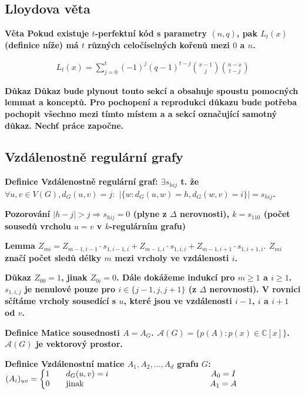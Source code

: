 \documentclass[a4paper,12pt,titlepage]{article}
\newcommand{\lm}{\smallskip\noindent\bf Lemma\rm{} }
\newcommand{\dk}{\smallskip\noindent\bf Důkaz\rm{} }
\newcommand{\df}{\smallskip\noindent\bf Definice\rm{} }
\newcommand{\vt}{\smallskip\noindent\bf Věta\rm{} }
\newcommand{\poz}{\smallskip\noindent\bf Pozorování\rm{} }
\newcommand{\A}{\mathcal{A}}
\newcommand{\C}{\mathbb{C}}
\begin{document}
\subsection{Lloydova věta}

\vt Pokud existuje $t$-perfektní kód s parametry $(n,q)$, pak $L_t(x)$ (definice níže) má $t$ různých celočíselných kořenů mezi $0$ a $n$.

\begin{align}
	L_t(x) = \sum_{j=0}^t(-1)^j(q-1)^{t-j}\binom{x-1}{j}\binom{n-x}{t-j}
\end{align}

\dk Důkaz bude plynout touto sekcí a obsahuje spoustu pomocných lemmat a konceptů. Pro pochopení a reprodukci důkazu bude potřeba pochopit všechno mezi tímto místem a a sekcí označující samotný důkaz. Nechť práce započne.

\subsection{Vzdálenostně regulární grafy}

\df Vzdálenostně regulární graf: $\exists s_{hij}$ t. že $\forall u,v\in V(G), d_G(u,v) = j:$ $|\{w: d_G(u,w) = h, d_G(w,v) = i\}| = s_{hij}$.

\poz $|h-j| > j \Rightarrow s_{hij} = 0$ (plyne z $\Delta$ nerovnosti), $k = s_{110}$ (počet sousedů vrcholu $u = v$ v $k$-regulárním grafu)

\lm $Z_{mi} = Z_{m-1,i-1} \cdot s_{1,i-1,i} + Z_{m-1,i} \cdot s_{1,i,i} + Z_{m-1,i+1} \cdot s_{1,i+1,i}.$ $Z_{mi}$ značí počet sledů délky $m$ mezi vrcholy ve vzdálenosti $i$.

\dk $Z_{00} = 1$, jinak $Z_{0i} = 0$. Dále dokážeme indukcí pro $m \ge 1$ a $i
\ge 1$. $s_{1,i,j}$ je nenulové pouze pro $i \in \{j-1,j,j+1\}$ (z $\Delta$
nerovnosti). V rovnici sčítáme vrcholy sousedící s $u$, které jsou ve
vzdálenosti $i-1$, $i$ a $i+1$ od $v$.

\df Matice sousednosti $A = A_G$. $\A(G) = \{p(A): p(x) \in \C[x]\}$. $\A(G)$ je
vektorový prostor.

\df Vzdálenostní matice $A_1, A_2, \dots, A_d$ grafu $G$: \\
\indent $(A_i)_{uv} = \left\{\begin{matrix}
1\quad & d_G(u,v) = i \hfill & \hspace{4cm} A_0 = I \\
0\quad & \text{jinak} \hfill & \hspace{4cm} A_1 = A \\
\end{matrix}\right.$
\end{document}

